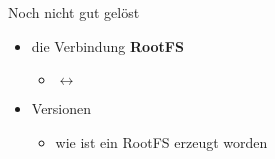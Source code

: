 \begin{frame}{Noch nicht gut gelöst}
 \begin{itemize}
  \item die Verbindung {\bf RootFS}
  \begin{itemize}
   \item \host $\leftrightarrow$ \targetS
  \end{itemize}
  \item Versionen
  \begin{itemize}
   \item wie ist ein RootFS erzeugt worden
  \end{itemize}
 \end{itemize}
\end{frame}
